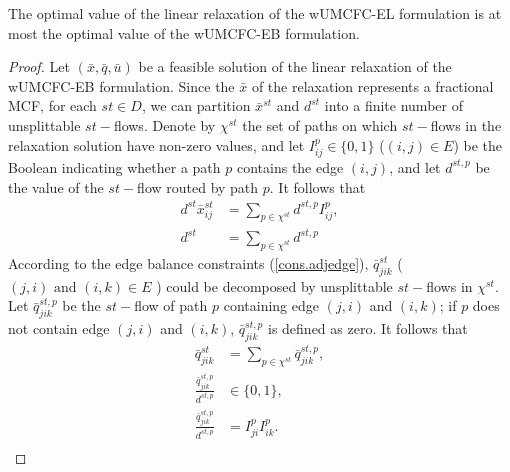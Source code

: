 \begin{theorem}
The optimal value of the linear relaxation of the wUMCFC-EL formulation is at most the optimal value of the wUMCFC-EB formulation.
\end{theorem}
\begin{proof}
Let \((\bar{x}, \bar{q}, \bar{u})\) be a feasible solution of the linear relaxation of the wUMCFC-EB formulation. Since the $\bar{x}$ of the relaxation represents a fractional MCF, for each \(st \in D\), we can partition \(\bar{x}^{st}\) and \(d^{st}\) into a finite number of unsplittable \(st-\)flows. Denote by \(\chi^{st}\) the set of paths on which \(st-\)flows in the relaxation solution have non-zero values, and let \(I^p_{ij} \in \{0,1\}\) (\((i,j) \in E\)) be the Boolean indicating whether a path \(p\) contains the edge \((i,j)\), and let \(d^{st,p}\) be the value of the \(st-\)flow routed by path \(p\). It follows that
\begin{equation}
\label{eq.indflows}
    \begin{split}
       d^{st} \bar{x}^{st}_{ij} &= \sum_{p \in \chi^{st}} d^{st,p} I^p_{ij}, \\
       d^{st} &= \sum_{p \in \chi^{st}} d^{st,p}
    \end{split}
\end{equation}
According to the edge balance constraints (\ref{cons.adjedge}), \(\bar{q}^{st}_{jik}\) (\((j,i) \text{ and } (i,k) \in E\) ) could be decomposed by unsplittable \(st-\)flows in \(\chi^{st}\).  Let \(\bar{q}^{st,p}_{jik}\) be the \(st-\)flow of path \(p\) containing edge \((j,i)\) and \((i,k)\); if \(p\) does not contain edge \((j,i)\) and \((i,k)\), \(\bar{q}^{st,p}_{jik}\) is defined as zero. It follows that
\begin{equation}
    \begin{split}
       \bar{q}^{st}_{jik} &= \sum_{p \in \chi^{st}} \bar{q}^{st,p}_{jik}, \\
       \frac{ \bar{q}^{st,p}_{jik} }{d^{st,p}} &\in \{0,1\},\\
       \frac{ \bar{q}^{st,p}_{jik} }{d^{st,p}} &=  I^p_{ji} I^p_{ik}.\\
    \end{split}
\end{equation}


\end{proof}
